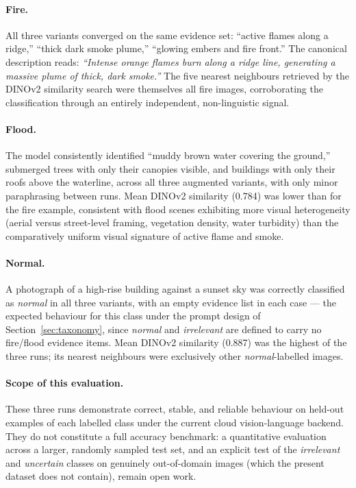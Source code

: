 \documentclass[11pt, a4paper]{article}
\begin{document}
\paragraph{Fire.} All three variants converged on the same evidence set: ``active flames along
a ridge,'' ``thick dark smoke plume,'' ``glowing embers and fire front.'' The canonical
description reads: \emph{``Intense orange flames burn along a ridge line, generating a massive
plume of thick, dark smoke.''} The five nearest neighbours retrieved by the DINOv2 similarity
search were themselves all fire images, corroborating the classification through an entirely
independent, non-linguistic signal.

\paragraph{Flood.} The model consistently identified ``muddy brown water covering the ground,''
submerged trees with only their canopies visible, and buildings with only their roofs above the
waterline, across all three augmented variants, with only minor paraphrasing between runs. Mean
DINOv2 similarity (0.784) was lower than for the fire example, consistent with flood scenes
exhibiting more visual heterogeneity (aerial versus street-level framing, vegetation density,
water turbidity) than the comparatively uniform visual signature of active flame and smoke.

\paragraph{Normal.} A photograph of a high-rise building against a sunset sky was correctly
classified as \emph{normal} in all three variants, with an empty evidence list in each case ---
the expected behaviour for this class under the prompt design of Section~\ref{sec:taxonomy},
since \emph{normal} and \emph{irrelevant} are defined to carry no fire/flood evidence items.
Mean DINOv2 similarity (0.887) was the highest of the three runs; its nearest neighbours were
exclusively other \emph{normal}-labelled images.

\paragraph{Scope of this evaluation.} These three runs demonstrate correct, stable, and
reliable behaviour on held-out examples of each labelled class under the current cloud
vision-language backend. They do not constitute a full accuracy benchmark: a quantitative
evaluation across a larger, randomly sampled test set, and an explicit test of the
\emph{irrelevant} and \emph{uncertain} classes on genuinely out-of-domain images (which the
present dataset does not contain), remain open work.
\end{document}
